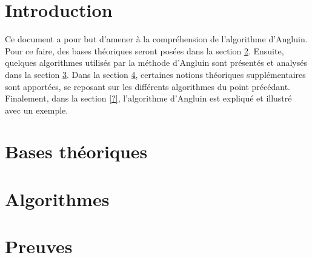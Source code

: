 

\newcommand{\student}{Benjamin André}
\newcommand{\grade}{MAB2 Sciences Informatiques}
\newcommand{\director}{Véronique Bruyère}
\renewcommand{\title}{Automates}
\renewcommand{\date}{\today}


	
	
	
	\tableofcontents
	\newpage
	
	\section{Introduction}
	Ce document a pour but d'amener à la compréhension de l'algorithme d'Angluin. Pour ce faire, des bases théoriques seront posées dans la section \ref{sec:theorie}. Ensuite, quelques algorithmes utilisés par la méthode d'Angluin sont présentés et analysés dans la section \ref{sec:algorithmes}. Dans la section \ref{sec:preuves}, certaines notions théoriques supplémentaires sont apportées, se reposant sur les différents algorithmes du point précédant. Finalement, dans la section \ref{?}, l'algorithme d'Angluin est expliqué et illustré avec un exemple.
	
	
	\section{Bases théoriques}\label{sec:theorie}
	 
	 
	\section{Algorithmes}\label{sec:algorithmes}
	
	
	\section{Preuves}\label{sec:preuves}

	
	\newpage
	
	
	
